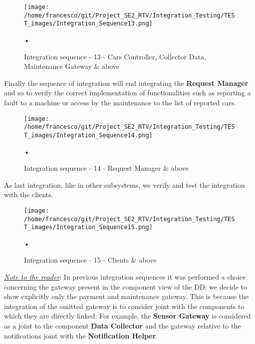 \documentclass[10pt, a4paper,titlepage]{article}
\begin{document}
\begin{figure}[h]
\begin{center}
\texttt{[image: /home/francesco/git/Project\_SE2\_RTV/Integration\_Testing/TEST\_images/Integration\_Sequence13.png]}
\caption{Integration sequence - 13 - Cars Controller, Collector Data, Maintenance Gateway \& above}
\label{fig:int_seq13}
\end{center}•
\end{figure}
\linebreak
Finally the sequence of integration will end integrating the \textbf{Request Manager} and so to verify the correct implementation of functionalities such as reporting a fault to a machine or access by the maintenance to the list of reported cars.
\begin{figure}[h]
\begin{center}
\texttt{[image: /home/francesco/git/Project\_SE2\_RTV/Integration\_Testing/TEST\_images/Integration\_Sequence14.png]}
\caption{Integration sequence - 14 - Request Manager \& above}
\label{fig:int_seq14}
\end{center}•
\end{figure}
As last integration, like in other subsystems, we verify and test the integration with the clients.
\begin{figure}[h]
\begin{center}
\texttt{[image: /home/francesco/git/Project\_SE2\_RTV/Integration\_Testing/TEST\_images/Integration\_Sequence15.png]}
\caption{Integration sequence - 15 - Clients \& above}
\label{fig:int_seq15}
\end{center}•
\end{figure}
\clearpage
\emph{\underline{Note to the reader}}: In previous integration sequences it was performed a choice concerning the gateway present in the component view of the DD: we decide to show explicitly only the payment and maintenance gateway. This is because the integration of the omitted gateway is to consider joint with the components to which they are directly linked: For example, the \textbf{Sensor Gateway} is considered as a joint to the component \textbf{Data Collector} and the gateway relative to the notifications joint with the \textbf{Notification Helper}.
\pagebreak
\end{document}
